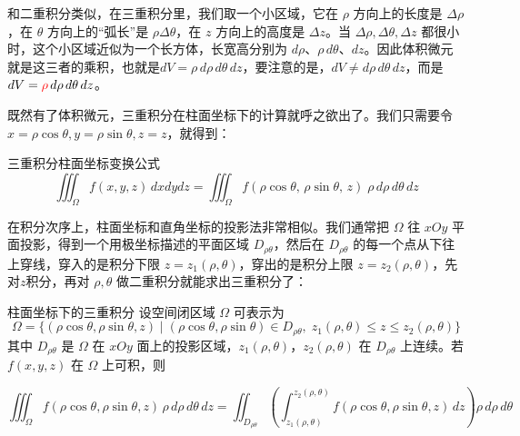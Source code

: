 \begin{center}
\end{center}

和二重积分类似，在三重积分里，我们取一个小区域，它在 \(\rho\) 方向上的长度是 \(\Delta \rho\)，在 \(\theta\) 方向上的“弧长”是 \(\rho\Delta\theta\)，在 \(z\) 方向上的高度是 \(\Delta z\)。当 \(\Delta \rho,\Delta\theta,\Delta z\) 都很小时，这个小区域近似为一个长方体，长宽高分别为 \(d\rho\)、\(\rho\,d\theta\)、\(dz\)。因此体积微元就是这三者的乘积，也就是\(dV = \rho\,d\rho\,d\theta\,dz\)，要注意的是，\(dV \ne d\rho\,d\theta\,dz\)，而是\(dV = \textcolor{red}{\rho}\,d\rho\,d\theta\,dz\)。

既然有了体积微元，三重积分在柱面坐标下的计算就呼之欲出了。我们只需要令\(x = \rho\cos\theta,y = \rho\sin\theta,z = z\)，就得到：
\begin{theorem}{三重积分柱面坐标变换公式}{}
    \[
\iiint_{\Omega} f(x,y,z)\,dxdydz
= \iiint_{\Omega} f(\rho\cos\theta,\, \rho\sin\theta,\, z)\; \rho\,d\rho\,d\theta\,dz
\]
\end{theorem}


在积分次序上，柱面坐标和直角坐标的投影法非常相似。我们通常把 \(\Omega\) 往 \(xOy\) 平面投影，得到一个用极坐标描述的平面区域 \(D_{\rho\theta}\)，然后在 \(D_{\rho\theta}\) 的每一个点从下往上穿线，穿入的是积分下限 \(z=z_1(\rho,\theta)\)，穿出的是积分上限 \(z=z_2(\rho,\theta)\)，先对\(z\)积分，再对 \(\rho,\theta\) 做二重积分就能求出三重积分了：

\begin{theorem}{柱面坐标下的三重积分}{}
设空间闭区域 \(\Omega\) 可表示为
\[
\Omega 
= \{(\rho\cos\theta, \rho\sin\theta, z) \mid(\rho\cos\theta, \rho\sin\theta) \in D_{\rho\theta},\;
z_1(\rho,\theta) \le z \le z_2(\rho,\theta)\}
\]
其中 \(D_{\rho\theta}\) 是 \(\Omega\) 在 \(xOy\) 面上的投影区域，\(z_1(\rho,\theta)\)，\(z_2(\rho,\theta)\) 在 \(D_{\rho\theta}\) 上连续。若 \(f(x,y,z)\) 在 \(\Omega\) 上可积，则

\[
\iiint_{\Omega} f(\rho\cos\theta, \rho\sin\theta, z)\,\rho\,d\rho\,d\theta\,dz
= \iint_{D_{\rho\theta}} \left( \int_{z_1(\rho,\theta)}^{z_2(\rho,\theta)} f(\rho\cos\theta, \rho\sin\theta, z)\,dz \right) \rho\,d\rho\,d\theta
\]
\end{theorem}

